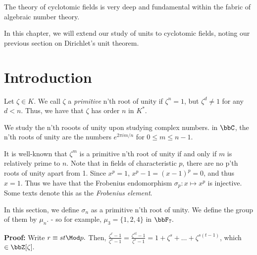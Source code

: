 \documentclass[a4paper, 12pt,oneside,openany]{book}
\begin{document}
The theory of cyclotomic fields is very deep and fundamental within the fabric of algebraic number theory. 

In this chapter, we will extend our study of units to cyclotomic fields, noting our previous section on Dirichlet's unit theorem. 

\section{Introduction}

Let $\zeta \in K.$ We call $\zeta$ a \emph{primitive} n'th root of unity if $\zeta^n=1$, but $\zeta^d \neq 1$ for any $d<n.$ Thus, we have that $\zeta$ has order $n$ in $K^*.$

We study the n'th rooots of unity upon studying complex numbers. in $\bbC$, the n'th roots of unity are the numbers $e^{2\pi i m/n}$ for $0 \leq m \leq n-1.$ 

It is well-known that $\zeta^m$ is a primitive n'th root of unity if and only if $m$ is relatively prime to $n.$ Note that in fields of characteristic $p$, there are no p'th roots of unity apart from 1. Since $x^p=1$, $x^p-1=(x-1)^p=0$, and thus $x=1.$ Thus we have that the Frobenius endomorphism $\sigma_p: x \mapsto x^p$ is injective. Some texts denote this as the \emph{Frobenius element}. 

In this section, we define $\sigma_n$ as a primitive n'th root of unity. We define the group of them by $\mu_n.$ - so for example, $\mu_3 = \{1, 2, 4\}$ in $\bbF_7.$



\textbf{Proof:} Write $r \equiv st \Mod p.$ Then, $\frac{\zeta^r-1}{\zeta^s-1}=\frac{\zeta^{st}-1}{\zeta^s-1}=1+\zeta^s+\dots+\zeta^{s(t-1)}$, which $\in \bbZ[\zeta].$
\end{document}
